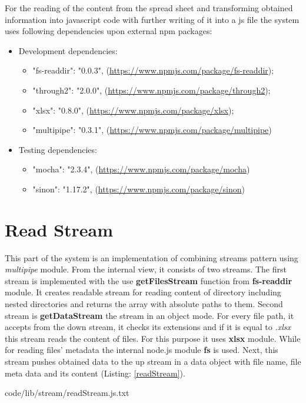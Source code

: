 For the reading of the content from the spread sheet and transforming obtained information into javascript code with further writing of it into a js file the system uses following dependencies upon external npm packages:
\begin{itemize}
	\item Development dependencies:
	\begin{itemize}
		\item  "fs-readdir": "0.0.3", (\url{https://www.npmjs.com/package/fs-readdir});
		\item "through2": "2.0.0", (\url{https://www.npmjs.com/package/through2});
		\item "xlsx": "0.8.0", (\url{https://www.npmjs.com/package/xlsx});
		\item "multipipe": "0.3.1", (\url{https://www.npmjs.com/package/multipipe})
	\end{itemize}
	\item Testing dependencies:
	\begin{itemize}
		\item "mocha": "2.3.4", (\url{https://www.npmjs.com/package/mocha})
		\item "sinon": "1.17.2", (\url{https://www.npmjs.com/package/sinon})
	\end{itemize}
\end{itemize}

\section{Read Stream}
\label{sec:read}
This part of the system is an implementation of combining streams pattern using \textit{multipipe} module. From the internal view, it consists of two streams.  The first stream is implemented with the use  \textbf{getFilesStream} function from\textbf{ fs-readdir} module. It creates readable stream for reading content of directory including nested directories and returns the array with absolute paths to them.
Second stream is \textbf{getDataStream} the stream in an object mode. 
For every file path, it accepts from the down stream, it checks its extensions and if it is equal to \textit{.xlsx} this stream reads the content of files. For this purpose it uses \textbf{xlsx} module. While for reading files' metadata the internal node.js module \textbf{fs} is used. Next, this stream pushes obtained data to the up stream in a data object with file name, file meta data and its content (Listing: \ref{readStream}).
 

{code/lib/stream/readStream.js.txt}

